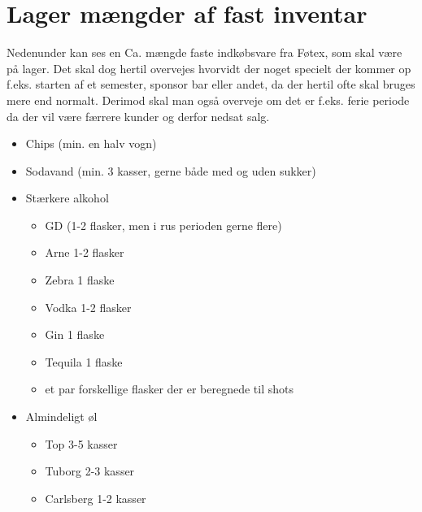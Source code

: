 \section{Lager mængder af fast inventar}
Nedenunder kan ses en Ca. mængde faste indkøbsvare fra Føtex, som skal være på lager. Det skal dog hertil overvejes hvorvidt der noget specielt der kommer op f.eks. starten af et semester, sponsor bar eller andet, da der hertil ofte skal bruges mere end normalt. Derimod skal man også overveje om det er f.eks. ferie periode da der vil være færrere kunder og derfor nedsat salg.
\begin{itemize}
    \item Chips (min. en halv vogn)
    \item Sodavand (min. 3 kasser, gerne både med og uden sukker)
    \item Stærkere alkohol
    \begin{itemize}
        \item GD (1-2 flasker, men i rus perioden gerne flere)
        \item Arne 1-2 flasker
        \item Zebra 1 flaske
        \item Vodka 1-2 flasker
        \item Gin 1 flaske
        \item Tequila 1 flaske
        \item et par forskellige flasker der er beregnede til shots
    \end{itemize}
    \item Almindeligt øl
    \begin{itemize}
        \item Top 3-5 kasser
        \item Tuborg 2-3 kasser
        \item Carlsberg 1-2 kasser
    \end{itemize}
\end{itemize}

